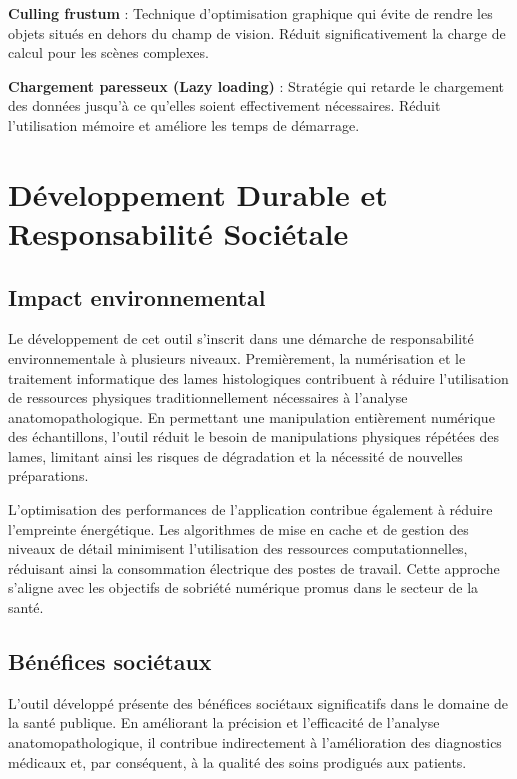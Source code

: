 \documentclass[12pt,a4paper]{report}
\let\oldchapter\chapter
\renewcommand{\chapter}{\clearpage\oldchapter}
\begin{document}
\begin{}
\begin{}
\begin{}
\textbf{Culling frustum} : Technique d'optimisation graphique qui évite de rendre les objets situés en dehors du champ de vision. Réduit significativement la charge de calcul pour les scènes complexes.

\textbf{Chargement paresseux (Lazy loading)} : Stratégie qui retarde le chargement des données jusqu'à ce qu'elles soient effectivement nécessaires. Réduit l'utilisation mémoire et améliore les temps de démarrage.

\chapter{Développement Durable et Responsabilité Sociétale}

\clearpage

\section{Impact environnemental}

Le développement de cet outil s'inscrit dans une démarche de responsabilité environnementale à plusieurs niveaux. Premièrement, la numérisation et le traitement informatique des lames histologiques contribuent à réduire l'utilisation de ressources physiques traditionnellement nécessaires à l'analyse anatomopathologique. En permettant une manipulation entièrement numérique des échantillons, l'outil réduit le besoin de manipulations physiques répétées des lames, limitant ainsi les risques de dégradation et la nécessité de nouvelles préparations.

L'optimisation des performances de l'application contribue également à réduire l'empreinte énergétique. Les algorithmes de mise en cache et de gestion des niveaux de détail minimisent l'utilisation des ressources computationnelles, réduisant ainsi la consommation électrique des postes de travail. Cette approche s'aligne avec les objectifs de sobriété numérique promus dans le secteur de la santé.

\section{Bénéfices sociétaux}

L'outil développé présente des bénéfices sociétaux significatifs dans le domaine de la santé publique. En améliorant la précision et l'efficacité de l'analyse anatomopathologique, il contribue indirectement à l'amélioration des diagnostics médicaux et, par conséquent, à la qualité des soins prodigués aux patients.


\end{}
\end{}
\end{}
\end{document}
